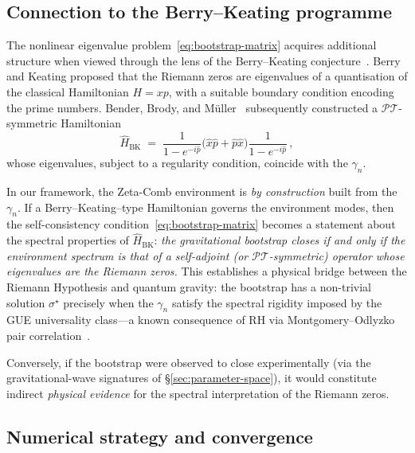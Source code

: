 \documentclass[12pt,a4paper]{article}
\begin{document}
\subsection{Connection to the Berry--Keating programme}
\label{subsec:berry-keating}

The nonlinear eigenvalue problem~\eqref{eq:bootstrap-matrix}
acquires additional structure when viewed through the lens
of the Berry--Keating conjecture~\cite{BerryKeating1999,
Bender2017BKHamiltonian}.
Berry and Keating proposed that the Riemann zeros are eigenvalues
of a quantisation of the classical Hamiltonian $H = xp$, with a
suitable boundary condition encoding the prime numbers.
Bender, Brody, and M\"uller~\cite{Bender2017BKHamiltonian}
subsequently constructed a $\mathcal{PT}$-symmetric Hamiltonian
%
\begin{equation}
  \hat{H}_{\mathrm{BK}}
  \;=\;
  \frac{1}{1 - e^{-i\hat{p}}}
  \bigl(\hat{x}\hat{p} + \hat{p}\hat{x}\bigr)
  \frac{1}{1 - e^{-i\hat{p}}}\,,
  \label{eq:BK-hamiltonian}
\end{equation}
%
whose eigenvalues, subject to a regularity condition, coincide with
the $\gamma_{n}$.

In our framework, the Zeta-Comb environment is \emph{by construction}
built from the $\gamma_{n}$.
If a Berry--Keating--type Hamiltonian governs the environment modes,
then the self-consistency condition~\eqref{eq:bootstrap-matrix}
becomes a statement about the spectral properties of
$\hat{H}_{\mathrm{BK}}$:
\emph{the gravitational bootstrap closes if and only if the
environment spectrum is that of a self-adjoint (or
$\mathcal{PT}$-symmetric) operator whose eigenvalues are
the Riemann zeros.}
This establishes a physical bridge between the Riemann Hypothesis
and quantum gravity: the bootstrap has a non-trivial solution
$\sigma^{\star}$ precisely when the $\gamma_{n}$ satisfy
the spectral rigidity imposed by the GUE universality class---a
known consequence of RH via Montgomery--Odlyzko pair
correlation~\cite{Montgomery1973,Odlyzko1987}.

Conversely, if the bootstrap were observed to close experimentally
(via the gravitational-wave signatures of
\S\ref{sec:parameter-space}), it would constitute indirect
\emph{physical evidence} for the spectral interpretation of the
Riemann zeros.


\subsection{Numerical strategy and convergence}
\label{subsec:numerical-strategy}
\end{document}
